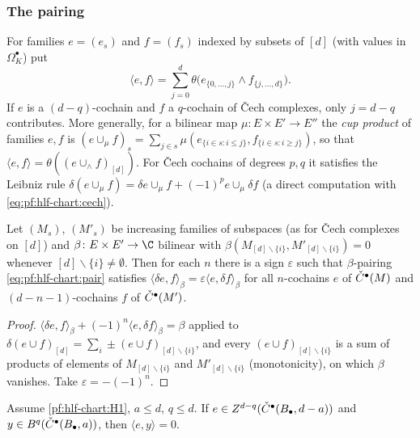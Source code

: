 \subsubsection*{The pairing}
For families $e=(e_s)$ and $f=(f_s)$ indexed by subsets of $[d]$ (with values in $\Omega^\bullet_K$) put
\begin{equation}\label{eq:pf:hlf-chart:pair}
  \langle e,f\rangle=\sum_{j=0}^{d}\theta\bigl(e_{\{0,\dots,j\}}\wedge f_{\{j,\dots,d\}}\bigr).
\end{equation}
If $e$ is a $(d-q)$-cochain and $f$ a $q$-cochain of \v{C}ech complexes, only $j=d-q$ contributes. More generally, for a bilinear map
$\mu\colon E\times E'\to E''$ the \emph{cup product} of families $e,f$ is $(e\cup_\mu f)_s=\sum_{j\in s}\mu(e_{\{i\in s:i\le j\}},f_{\{i\in s:i\ge j\}})$,
so that $\langle e,f\rangle=\theta((e\cup_\wedge f)_{[d]})$. For \v{C}ech cochains of degrees $p,q$ it satisfies the Leibniz rule
$\delta(e\cup_\mu f)=\delta e\cup_\mu f+(-1)^pe\cup_\mu\delta f$ (a direct computation with \eqref{eq:pf:hlf-chart:cech}).

\begin{lemma}[Adjointness]\label{pf:hlf-chart:adj}
Let $(M_s)$, $(M'_s)$ be increasing families of subspaces (as for \v{C}ech complexes on $[d]$) and $\beta\colon E\times E'\to\C$ bilinear with
$\beta(M_{[d]\smallsetminus\{i\}},M'_{[d]\smallsetminus\{i\}})=0$ whenever $[d]\smallsetminus\{i\}\ne\emptyset$. Then for each $n$ there is a sign $\varepsilon$
such that $\beta$-pairing \eqref{eq:pf:hlf-chart:pair} satisfies $\langle\delta e,f\rangle_\beta=\varepsilon\langle e,\delta f\rangle_\beta$ for all
$n$-cochains $e$ of $\check{C}^\bullet(M)$ and $(d-n-1)$-cochains $f$ of $\check{C}^\bullet(M')$.
\end{lemma}

\begin{proof}
$\langle\delta e,f\rangle_\beta+(-1)^n\langle e,\delta f\rangle_\beta=\beta$ applied to $\delta(e\cup f)_{[d]}=\sum_i\pm(e\cup f)_{[d]\smallsetminus\{i\}}$,
and every $(e\cup f)_{[d]\smallsetminus\{i\}}$ is a sum of products of elements of $M_{[d]\smallsetminus\{i\}}$ and $M'_{[d]\smallsetminus\{i\}}$
(monotonicity), on which $\beta$ vanishes. Take $\varepsilon=-(-1)^n$.
\end{proof}

\begin{lemma}\label{pf:hlf-chart:prb}
Assume \ref{pf:hlf-chart:H1}, $a\le d$, $q\le d$. If $e\in Z^{d-q}(\check{C}^\bullet(B_\bullet,d-a))$ and $y\in B^q(\check{C}^\bullet(B_\bullet,a))$, then
$\langle e,y\rangle=0$.
\end{lemma}

